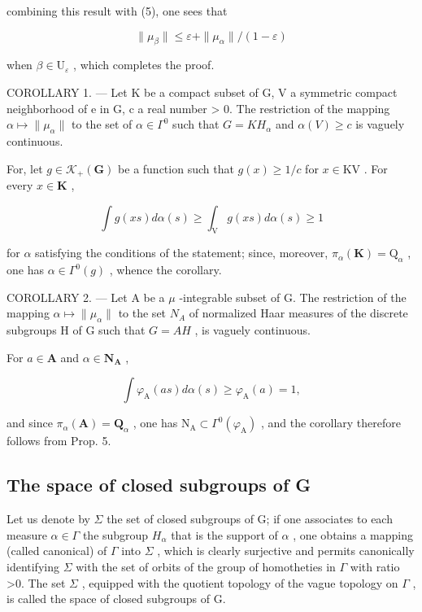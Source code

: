 combining this result with (5), one sees that

\[
\| \mu_ {\beta} \| \leqslant \varepsilon + \| \mu_ {\alpha} \| / (1 - \varepsilon)
\]

when \(\beta \in \mathrm{U}_{\varepsilon}\) , which completes the proof.

COROLLARY 1. --- Let K be a compact subset of G, V a symmetric compact neighborhood of e in G, c a real number \textgreater{} 0. The restriction of the mapping \(\alpha \mapsto \|\mu_{\alpha}\|\) to the set of \(\alpha \in \Gamma^0\) such that \(G = KH_{\alpha}\) and \(\alpha(V) \geqslant c\) is vaguely continuous.

For, let \(g \in \mathcal{K}_{+}(\mathbf{G})\) be a function such that \(g(x) \geqslant 1 / c\) for \(x \in \mathrm{KV}\) . For every \(x \in \mathbf{K}\) ,

\[
\int g (x s) d \alpha (s) \geqslant \int_ {\mathrm{V}} g (x s) d \alpha (s) \geqslant 1
\]

for \(\alpha\) satisfying the conditions of the statement; since, moreover, \(\pi_{\alpha}(\mathbf{K}) = \mathrm{Q}_{\alpha}\) , one has \(\alpha \in \Gamma^0(g)\) , whence the corollary.

COROLLARY 2. --- Let A be a \(\mu\) -integrable subset of G. The restriction of the mapping \(\alpha \mapsto \|\mu_{\alpha}\|\) to the set \(N_A\) of normalized Haar measures of the discrete subgroups H of G such that \(G = AH\) , is vaguely continuous.

For \(a \in \mathbf{A}\) and \(\alpha \in \mathbf{N}_{\mathbf{A}}\) ,

\[
\int \varphi_ {\mathrm{A}} (a s) d \alpha (s) \geqslant \varphi_ {\mathrm{A}} (a) = 1,
\]

and since \(\pi_{\alpha}(\mathbf{A}) = \mathbf{Q}_{\alpha}\) , one has \(\mathrm{N}_{\mathrm{A}} \subset \Gamma^{0}(\varphi_{\mathrm{A}})\) , and the corollary therefore follows from Prop. 5.

\subsection{The space of closed subgroups of G}

Let us denote by \(\Sigma\) the set of closed subgroups of G; if one associates to each measure \(\alpha\in\Gamma\) the subgroup \(H_{\alpha}\) that is the support of \(\alpha\) , one obtains a mapping (called canonical) of \(\Gamma\) into \(\Sigma\) , which is clearly surjective and permits canonically identifying \(\Sigma\) with the set of orbits of the group of homotheties in \(\Gamma\) with ratio \textgreater0. The set \(\Sigma\) , equipped with the quotient topology of the vague topology on \(\Gamma\) , is called the space of closed subgroups of G.

